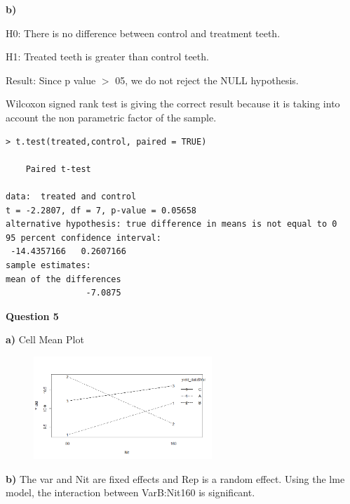\documentclass[12pt,letterpaper]{article}
\begin{document}
\textbf{{b)}}

H0: There is no difference between control and treatment teeth.

H1: Treated teeth is greater than control teeth.

Result: Since p value $>$ 05, we do not reject the NULL hypothesis.  

Wilcoxon signed rank test is giving the correct result because it is taking into account the non parametric factor of the sample. 

\begin{lstlisting}[label=R Code,caption=Q4 (b) R Code Output]
> t.test(treated,control, paired = TRUE)

	Paired t-test

data:  treated and control
t = -2.2807, df = 7, p-value = 0.05658
alternative hypothesis: true difference in means is not equal to 0
95 percent confidence interval:
 -14.4357166   0.2607166
sample estimates:
mean of the differences 
                -7.0875 
\end{lstlisting}

{\Large \textbf{Question 5}} 

\textbf{{a)}} Cell Mean Plot

\begin{center}
\begin{figure}{}
\centering
\includegraphics[width=0.6\textwidth]{cellMeanPlot.png}
\caption{\label{fig:frog2}}
\end{figure}
\end{center}

\textbf{{b)}}
The var and Nit are fixed effects and Rep is a random effect. Using the lme model, the interaction between VarB:Nit160 is significant.
\end{document}
